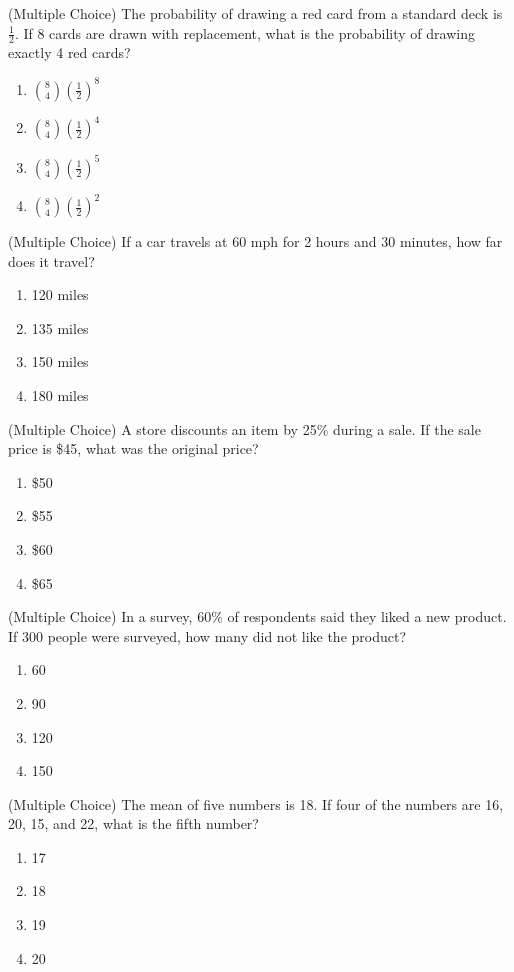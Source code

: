 \documentclass[12pt]{article}
\begin{document}
  \item (Multiple Choice) The probability of drawing a red card from a standard deck is \(\frac{1}{2}\). If 8 cards are drawn with replacement, what is the probability of drawing exactly 4 red cards?
    \begin{enumerate}[label=(\Alph*)]
      \item \(\binom{8}{4}\left(\frac{1}{2}\right)^8\)
      \item \(\binom{8}{4}\left(\frac{1}{2}\right)^4\)
      \item \(\binom{8}{4}\left(\frac{1}{2}\right)^5\)
      \item \(\binom{8}{4}\left(\frac{1}{2}\right)^2\)
    \end{enumerate}
    
  \item (Multiple Choice) If a car travels at 60 mph for 2 hours and 30 minutes, how far does it travel?
    \begin{enumerate}[label=(\Alph*)]
      \item 120 miles
      \item 135 miles
      \item 150 miles
      \item 180 miles
    \end{enumerate}
    
  \item (Multiple Choice) A store discounts an item by 25\% during a sale. If the sale price is \$45, what was the original price?
    \begin{enumerate}[label=(\Alph*)]
      \item \$50
      \item \$55
      \item \$60
      \item \$65
    \end{enumerate}
    
  \item (Multiple Choice) In a survey, 60\% of respondents said they liked a new product. If 300 people were surveyed, how many did not like the product?
    \begin{enumerate}[label=(\Alph*)]
      \item 60
      \item 90
      \item 120
      \item 150
    \end{enumerate}
    
  \item (Multiple Choice) The mean of five numbers is 18. If four of the numbers are 16, 20, 15, and 22, what is the fifth number?
    \begin{enumerate}[label=(\Alph*)]
      \item 17
      \item 18
      \item 19
      \item 20
    \end{enumerate}
    
\end{document}

